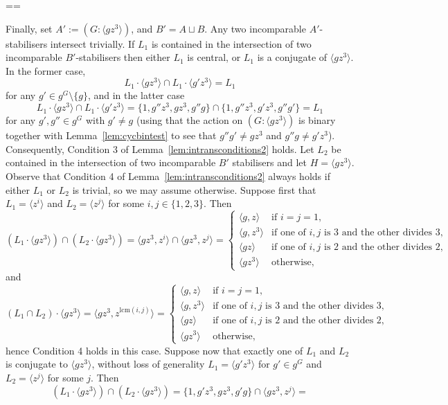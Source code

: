 \documentclass[11pt, a4paper]{amsart}
\makeatletter
\newcommand\lcm{\mathrm{lcm}}
\renewcommand{\proofname}{Proof}
\renewenvironment{proof}[1][\proofname]{\par
  \pushQED{\qed}  \normalfont \partopsep=\z@skip \topsep=\z@skip
  \trivlist
  \item[\hskip\labelsep
        \scshape
    #1\@addpunct{.}]\ignorespaces
}{  \popQED\endtrivlist\@endpefalse
}
\makeatother
\begin{document}
\begin{proof}
    Finally, set $A':=(G: \langle gz^3\rangle)$, and $B'=A\sqcup B$. Any two incomparable $A'$-stabilisers intersect trivially. If $L_1$ is contained in the intersection of two incomparable $B'$-stabilisers then either $L_1$ is central, or $L_1$ is a conjugate of $\langle gz^3\rangle$. In the former case, $$L_1\cdot \langle gz^3\rangle\cap L_1\cdot\langle g'z^3\rangle=L_1$$ for any $g'\in g^G\setminus\{g\}$, and in the latter case $$L_1\cdot \langle gz^3\rangle\cap L_1\cdot\langle g'z^3\rangle=\{1,g''z^3, gz^3,g''g\}\cap \{1,g''z^3, g'z^3,g''g'\}=L_1$$ for any $g',g''\in g^G$ with $g'\ne g$ (using that the action on $(G:\langle gz^3\rangle)$ is binary together with Lemma~\ref{lem:cycbintest} to see that $g''g'\ne gz^3$ and $g''g\ne g'z^3$). Consequently, Condition 3 of Lemma~\ref{lem:intransconditions2} holds. Let $L_2$ be contained in the intersection of two incomparable $B'$ stabilisers and let $H=\langle gz^3\rangle$. Observe that Condition 4 of Lemma~\ref{lem:intransconditions2} always holds if either $L_1$ or $L_2$ is trivial, so we may assume otherwise. Suppose first that $L_1=\langle z^i\rangle$ and $L_2=\langle z^j\rangle$ for some $i,j\in\{1,2,3\}$. Then
    $$(L_1\cdot\langle gz^3\rangle)\cap (L_2\cdot\langle gz^3\rangle)=\langle gz^3,z^i\rangle\cap \langle gz^3,z^j\rangle=\begin{cases}
        \langle g,z\rangle&\text{if $i=j=1$,}\\
        \langle g,z^3\rangle&\text{if one of $i,j$ is 3 and the other divides 3,}\\
        \langle gz\rangle&\text{if one of $i,j$ is 2 and the other divides 2,}\\
        \langle gz^3\rangle &\text{otherwise,}
    \end{cases}$$
    and 
    $$(L_1\cap L_2)\cdot \langle gz^3\rangle=\langle gz^3,z^{\lcm(i,j)}\rangle=\begin{cases}
        \langle g,z\rangle&\text{if $i=j=1$,}\\
        \langle g,z^3\rangle&\text{if one of $i,j$ is 3 and the other divides 3,}\\
        \langle gz\rangle&\text{if one of $i,j$ is 2 and the other divides 2,}\\
        \langle gz^3\rangle &\text{otherwise,}
    \end{cases}$$
    hence Condition 4 holds in this case. Suppose now that exactly one of $L_1$ and $L_2$ is conjugate to $\langle gz^3\rangle$, without loss of generality $L_1=\langle g'z^3\rangle$ for $g'\in g^G$ and $L_2=\langle z^j\rangle$ for some $j$. Then $$(L_1\cdot\langle gz^3\rangle)\cap (L_2\cdot\langle gz^3\rangle)=\{1,g'z^3, gz^3,g'g\}\cap \langle gz^3,z^j\rangle=
$$
\end{proof}
\end{document}
